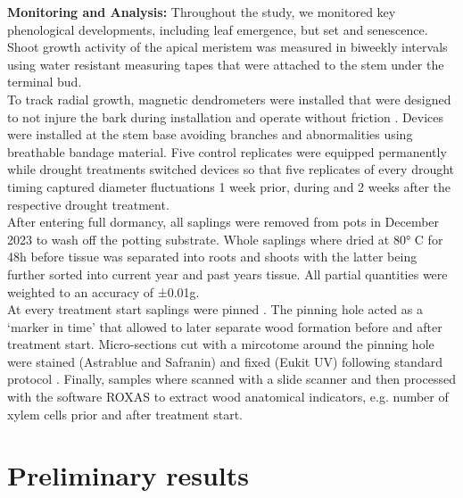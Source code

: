 \documentclass{article}
\begin{document}
\textbf{Monitoring and Analysis:}
	Throughout the study, we monitored key phenological developments, including leaf emergence, but set and senescence. 
	Shoot growth activity of the apical meristem was measured in biweekly intervals using water resistant measuring tapes that were attached to the stem under the terminal bud. \\
	
	To track radial growth, magnetic dendrometers were installed that were designed to not injure the bark during installation and operate without friction \citep{clonchHighPrecisionZerofriction2021}. Devices were installed at the stem base avoiding branches and abnormalities using breathable bandage material. Five control replicates were equipped permanently while drought treatments switched devices so that five replicates of every drought timing captured diameter fluctuations 1 week prior, during and 2 weeks after the respective drought treatment. \\
	After entering full dormancy, all saplings were removed from pots in December 2023 to wash off the potting substrate. Whole saplings where dried at 80° C for 48h before tissue was separated into roots and shoots with the latter being further sorted into current year and past years tissue. All partial quantities were weighted to an accuracy of ±0.01g.\\ 
	\indent At every treatment start saplings were pinned \citep{gartnerCambialActivityMoringa2021a}. The pinning hole acted as a `marker in time' that allowed to later separate wood formation before and after treatment start. Micro-sections cut with a mircotome around the pinning hole were stained (Astrablue and Safranin) and fixed (Eukit UV) following standard protocol \citep{gartnerMicroscopicPreparationTechniques2013}. Finally, samples where scanned with a slide scanner and then processed with the software ROXAS to extract wood anatomical indicators, e.g. number of xylem cells prior and after treatment start.

	\section*{Preliminary results}
	
\end{document}
